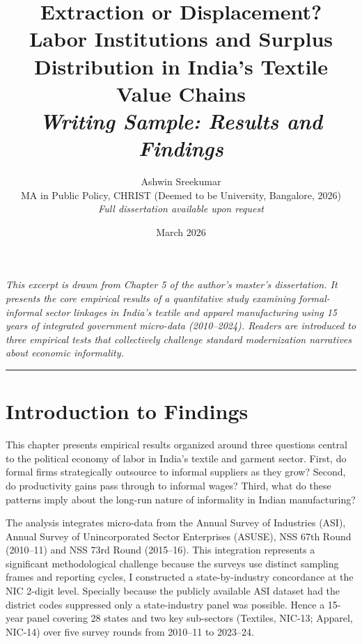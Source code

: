 \documentclass[12pt, a4paper]{article}
\title{%
  \vspace{-1cm}
  \Large\textbf{Extraction or Displacement?}\\[4pt]
  \large Labor Institutions and Surplus Distribution in India's Textile Value Chains\\[8pt]
  \normalsize \textit{Writing Sample: Results and Findings}
}
\author{%
  Ashwin Sreekumar\\
  \small MA in Public Policy, CHRIST (Deemed to be University, Bangalore, 2026)\\[2pt]
  \small \textit{Full dissertation available upon request}
}
\date{March 2026}
\begin{document}
\maketitle
\thispagestyle{empty}

\begin{center}
\small\textit{%
  This excerpt is drawn from Chapter 5 of the author's master's dissertation.
  It presents the core empirical results of a quantitative study examining
  formal-informal sector linkages in India's textile and apparel manufacturing
  using 15 years of integrated government micro-data (2010--2024).
  Readers are introduced to three empirical tests that collectively challenge
  standard modernization narratives about economic informality.
}
\end{center}

\vspace{4pt}
\hrule
\vspace{12pt}

\section{Introduction to Findings}

This chapter presents empirical results organized around three questions central to the political economy of labor in India's textile and garment sector. First, do formal firms strategically outsource to informal suppliers as they grow? Second, do productivity gains pass through to informal wages? Third, what do these patterns imply about the long-run nature of informality in Indian manufacturing?

The analysis integrates micro-data from the Annual Survey of Industries (ASI), Annual Survey of Unincorporated Sector Enterprises (ASUSE), NSS 67th Round (2010–11) and NSS 73rd Round (2015–16). This integration represents a significant methodological challenge because the surveys use distinct sampling frames and reporting cycles, I constructed a state-by-industry concordance at the NIC 2-digit level. Specially because the publicly available ASI dataset had the district codes suppressed only a state-industry panel was possible. Hence a 15-year panel covering 28 states and two key sub-sectors (Textiles, NIC-13; Apparel, NIC-14) over five survey rounds from 2010--11 to 2023--24.
\end{document}
